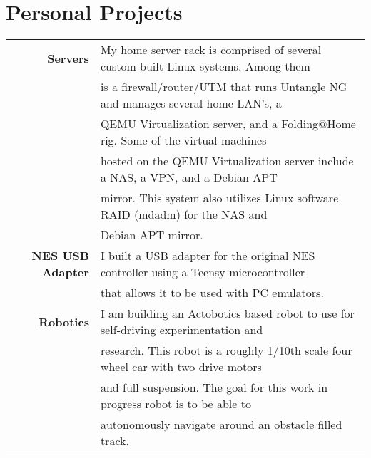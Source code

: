 \documentclass[a4paper,10pt]{article}
\begin{document}
	\section*{Personal Projects}
        \vspace*{1ex}
        \begin{tabular}{rl}
            \textbf{Servers} & My home server rack is comprised of several custom built Linux systems. Among them \\
                             & is a firewall/router/UTM that runs Untangle NG and manages several home LAN's, a \\
                             & QEMU Virtualization server, and a Folding@Home rig. Some of the virtual machines \\
                             & hosted on the QEMU Virtualization server include a NAS, a VPN, and a Debian APT \\
                             & mirror. This system also utilizes Linux software RAID (mdadm) for the NAS and \\
                             & Debian APT mirror.\\[1ex]
            \textbf{NES USB Adapter} & I built a USB adapter for the original NES controller using a Teensy microcontroller \\
                                     & that allows it to be used with PC emulators. \\[1ex]
            \textbf{Robotics} & I am building an Actobotics based robot to use for self-driving experimentation and \\
                              & research. This robot is a roughly 1/10th scale four wheel car with two drive motors \\
                              & and full suspension. The goal for this work in progress robot is to be able to \\
                              & autonomously navigate around an obstacle filled track. \\[1ex]
        \end{tabular}
\end{document}
